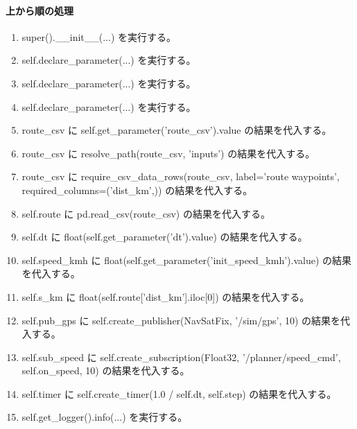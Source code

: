 \documentclass[a4paper,11pt]{article}
\begin{document}
            \paragraph{上から順の処理}
            \begin{enumerate}[leftmargin=1.8em]
            \item super().\_\_init\_\_(...) を実行する。
\item self.declare\_parameter(...) を実行する。
\item self.declare\_parameter(...) を実行する。
\item self.declare\_parameter(...) を実行する。
\item route\_csv に self.get\_parameter('route\_csv').value の結果を代入する。
\item route\_csv に resolve\_path(route\_csv, 'inputs') の結果を代入する。
\item route\_csv に require\_csv\_data\_rows(route\_csv, label='route waypoints', required\_columns=('dist\_km',)) の結果を代入する。
\item self.route に pd.read\_csv(route\_csv) の結果を代入する。
\item self.dt に float(self.get\_parameter('dt').value) の結果を代入する。
\item self.speed\_kmh に float(self.get\_parameter('init\_speed\_kmh').value) の結果を代入する。
\item self.s\_km に float(self.route['dist\_km'].iloc[0]) の結果を代入する。
\item self.pub\_gps に self.create\_publisher(NavSatFix, '/sim/gps', 10) の結果を代入する。
\item self.sub\_speed に self.create\_subscription(Float32, '/planner/speed\_cmd', self.on\_speed, 10) の結果を代入する。
\item self.timer に self.create\_timer(1.0 / self.dt, self.step) の結果を代入する。
\item self.get\_logger().info(...) を実行する。
            \end{enumerate}
\end{document}
